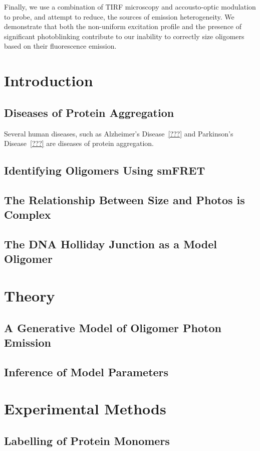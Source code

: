 Finally, we use a combination of TIRF microscopy and accousto-optic modulation to probe, and attempt to reduce, the sources of emission heterogeneity. We demonstrate that both the non-uniform excitation profile and the presence of significant photoblinking contribute to our inability to correctly size oligomers based on their fluorescence emission. 

\section{Introduction}
\subsection{Diseases of Protein Aggregation}
Several human diseases, such as Alzheimer's Disease~\ref{???} and Parkinson's Disease~\ref{???} are diseases of protein aggregation.
\subsection{Identifying Oligomers Using smFRET}
\subsection{The Relationship Between Size and Photos is Complex}
\subsection{The DNA Holliday Junction as a Model Oligomer}

\section{Theory}
\subsection{A Generative Model of Oligomer Photon Emission}
\subsection{Inference of Model Parameters}

\section{Experimental Methods}
\subsection{Labelling of Protein Monomers}
